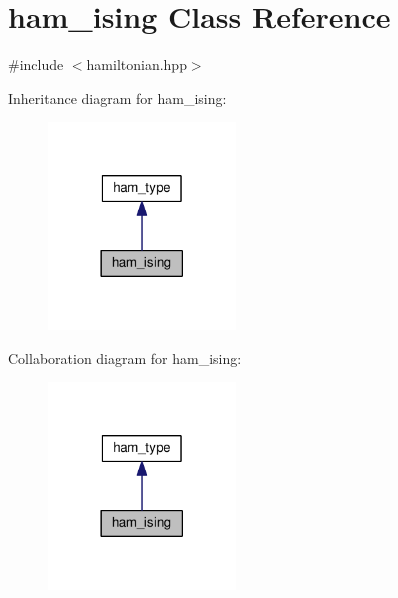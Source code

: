 \hypertarget{classham__ising}{}\section{ham\+\_\+ising Class Reference}
\label{classham__ising}


{\ttfamily \#include $<$hamiltonian.\+hpp$>$}



Inheritance diagram for ham\+\_\+ising\+:
\nopagebreak
\begin{figure}[H]
\begin{center}
\leavevmode
\includegraphics[width=141pt]{d1/de5/classham__ising__inherit__graph}
\end{center}
\end{figure}


Collaboration diagram for ham\+\_\+ising\+:
\nopagebreak
\begin{figure}[H]
\begin{center}
\leavevmode
\includegraphics[width=141pt]{d7/d27/classham__ising__coll__graph}
\end{center}
\end{figure}
